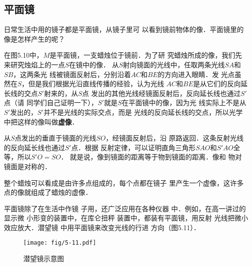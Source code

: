     \subsection{平面镜}

    日常生活中用的镜子都是平面镜，从镜子里可
    以看到镜前物体的像．平面镜里的像是怎样产生的呢？

    在图5.10中，$M$是平面镜，一支蜡烛位于镜前．为了研
    究蜡烛所成的像，我们先来研究烛焰上的一点$S$在镜中的像．
    从$S$射向镜面的光线中，任取两条光线$SA$和$SB$，这两条光
    线被镜面反射后，分别沿着$AC$和$BE$的方向进入眼睛．发
    光点虽然在$S$，但是我们根据光沿直线传播的经验，认为光线
    $AC$和$BE$是从它们的反向延长线的交点$S'$射来的，从$S$点
    发出的其他光线经镜面反射后，反向延长线也通过$S'$点（请
    同学们自己证明一下），$S'$就是$S$在平面镜中的像，因为光
    线实际上不是从$S'$发出的，$S'$并不是光线的实际交点，而是
    光线的反向延长线的交点，所以光学中把这样的像叫做\textbf{虚像}．

    从$S$点发出的垂直于镜面的光线$SO$，经镜面反射后，沿
    原路返回．这条反射光线的反向延长线也通过$S'$点．根据
    反射定律，可以证明直角三角形$SAO$和$S'AO$全等，所以$S'O=SO$．
    就是说，像到镜面的距离等于物到镜面的距离．像和
    物对镜面是对称的．

    整个蜡烛可以看成是由许多点组成的，每个点都在镜子
    里产生一个虚像，这许多点的像就组成了蜡烛的虚像．

    平面镜除了在生活中作镜
    子用，还广泛应用在各种仪器
    中．例如，在高一讲过的显示微
    小形变的装置中，在库仑扭秤
    装置中，都装有平面镜，用反射
    光线把微小效应放大．潜望镜
    中用平面镜来改变光线的行进
    方向（图5.11）．
    \begin{figure}[htp]\centering
        \texttt{[image: fig/5-11.pdf]}
        \caption{潜望镜示意图}
    \end{figure}

